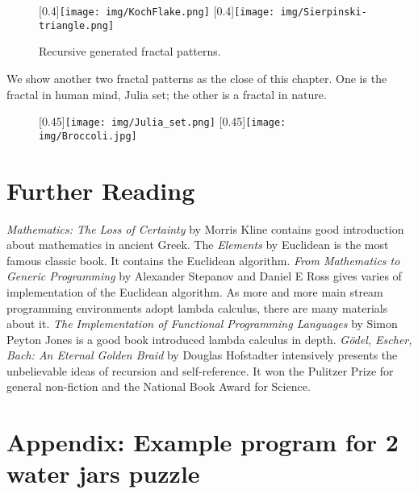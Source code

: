 \documentclass{article}
\begin{document}
\begin{figure}[htbp]
 \centering
 [0.4\linewidth]{\texttt{[image: img/KochFlake.png]}}
 [0.4\linewidth]{\texttt{[image: img/Sierpinski-triangle.png]}}
 \caption{Recursive generated fractal patterns.}
 \label{fig:fractal}
\end{figure}

We show another two fractal patterns as the close of this chapter. One is the fractal in human mind, Julia set; the other is a fractal in nature.

\begin{figure}[htbp]
 \centering
 [0.45\linewidth]{\texttt{[image: img/Julia\_set.png]}}
 [0.45\linewidth]{\texttt{[image: img/Broccoli.jpg]}}
 \label{fig:more-fractal}
\end{figure}

\section{Further Reading}

{\em Mathematics: The Loss of Certainty} by Morris Kline contains good introduction about mathematics in ancient Greek. The {\em Elements} by Euclidean is the most famous classic book. It contains the Euclidean algorithm. {\em From Mathematics to Generic Programming} by Alexander Stepanov and Daniel E Ross gives varies of implementation of the Euclidean algorithm. As more and more main stream programming environments adopt lambda calculus, there are many materials about it. {\em The Implementation of Functional Programming Languages} by Simon Peyton Jones is a good book introduced lambda calculus in depth. {\em Gödel, Escher, Bach: An Eternal Golden Braid} by Douglas Hofstadter intensively presents the unbelievable ideas of recursion and self-reference. It won the Pulitzer Prize for general non-fiction and the National Book Award for Science.

\section{Appendix: Example program for 2 water jars puzzle}
\end{document}
